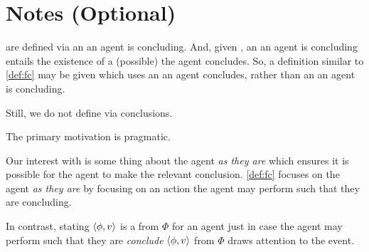 

\section[Notes]{Notes \hfill (Optional)}


\begin{note}
   are defined via an  an agent is concluding.
  And, given \assuPP{}, an  an agent is concluding entails the existence of a (possible)  the agent concludes.
  So, a definition similar to \autoref{def:fc} may be given which uses an  an agent concludes, rather than an  an agent is concluding.

  Still, we do not define  via conclusions.
\end{note}

\begin{note}
  The primary motivation is pragmatic.

  Our interest with  is some thing about the agent \emph{as they are} which ensures it is possible for the agent to make the relevant conclusion.
  \autoref{def:fc} focuses on the agent \emph{as they are} by focusing on an action the agent may perform such that they are concluding.

  In contrast, stating \(\langle\phi, v\rangle\) is a \fc{} from \(\Phi\) for an agent just in case the agent may perform such that they are \emph{conclude} \(\langle\phi, v\rangle\) from \(\Phi\) draws attention to the event.
\end{note}

